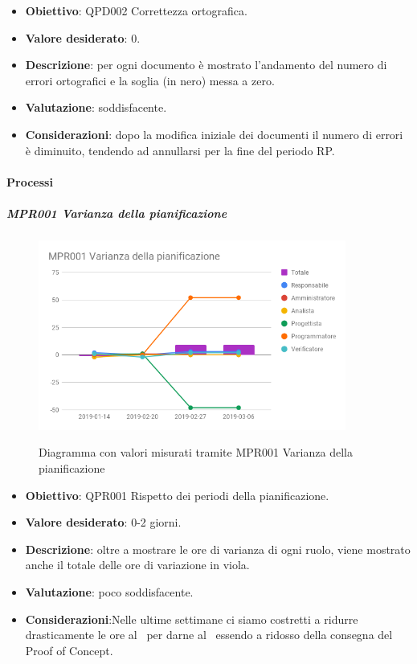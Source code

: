 	\begin{itemize}
		\item \textbf{Obiettivo}: QPD002 Correttezza ortografica.
		\item \textbf{Valore desiderato}: 0.
		\item \textbf{Descrizione}: per ogni documento è mostrato l'andamento del numero di errori ortografici e la soglia (in nero) messa a zero.
		\item \textbf{Valutazione}: soddisfacente.
		\item \textbf{Considerazioni}: dopo la modifica iniziale dei documenti il numero di errori è diminuito, tendendo ad annullarsi per la fine del periodo RP.
	\end{itemize}



	\paragraph{Processi}

	\subparagraph{MPR001 Varianza della pianificazione}

	\begin{figure}[H]
		\centering
		\includegraphics[width=0.9\textwidth]{img/cruscotti/MPR001.png}
		\label{immagineVarianzaPianificazione}
		\caption{Diagramma con valori misurati tramite MPR001 Varianza della pianificazione}
	\end{figure}

	\begin{itemize}
		\item \textbf{Obiettivo}: QPR001 Rispetto dei periodi della pianificazione.
		\item \textbf{Valore desiderato}: 0-2 giorni.
		\item \textbf{Descrizione}: oltre a mostrare le ore di varianza di ogni ruolo, viene mostrato anche il totale delle ore di variazione in viola. 
		\item \textbf{Valutazione}: poco soddisfacente.
		\item \textbf{Considerazioni}:Nelle ultime settimane ci siamo costretti a ridurre drasticamente le ore al \Prog\ per darne al \Progr\ essendo a ridosso della consegna del Proof of Concept.
	\end{itemize}


